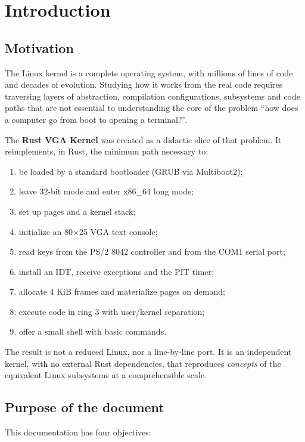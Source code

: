 \chapter{Introduction}
\label{cap:introducao}

\section{Motivation}

The Linux kernel is a complete operating system, with millions of lines of
code and decades of evolution. Studying how it works from the real code
requires traversing layers of abstraction, compilation configurations,
subsystems and code paths that are not essential to understanding the core of
the problem ``how does a computer go from boot to opening a terminal?''.

The \textbf{Rust VGA Kernel} was created as a didactic slice of that problem.
It reimplements, in Rust, the minimum path necessary to:

\begin{enumerate}
  \item be loaded by a standard bootloader (GRUB via Multiboot2);
  \item leave 32-bit mode and enter x86\_64 long mode;
  \item set up pages and a kernel stack;
  \item initialize an 80$\times$25 VGA text console;
  \item read keys from the PS/2 8042 controller and from the COM1 serial port;
  \item install an IDT, receive exceptions and the PIT timer;
  \item allocate 4 KiB frames and materialize pages on demand;
  \item execute code in ring 3 with user/kernel separation;
  \item offer a small shell with basic commands.
\end{enumerate}

The result is not a reduced Linux, nor a line-by-line port. It is an
independent kernel, with no external Rust dependencies, that reproduces
\emph{concepts} of the equivalent Linux subsystems at a comprehensible scale.

\section{Purpose of the document}

This documentation has four objectives:

